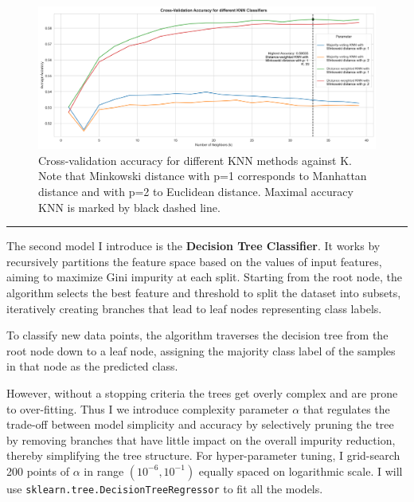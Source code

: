 \documentclass{assignment}
\begin{document}
\bigskip
\bigskip




\begin{figure}[H]
\centering
\includegraphics[width=0.9\linewidth]{KNN_classifier_hyperparameter_tuning_plot.png}
\caption{\label{fig:KNN_classifier_hyperparameter_tuning_plot}Cross-validation accuracy for different KNN methods against K. Note that Minkowski distance with p=1 corresponds to Manhattan distance and with p=2 to Euclidean distance. Maximal accuracy KNN is marked by black dashed line.}
\end{figure}


\newpage

\noindent\rule{16.5cm}{0.55pt}

\bigskip


The second model I introduce is the \textbf{Decision Tree Classifier}. It works by recursively partitions the feature space based on the values of input features, aiming to maximize Gini impurity at each split. Starting from the root node, the algorithm selects the best feature and threshold to split the dataset into subsets, iteratively creating branches that lead to leaf nodes representing class labels. 

\medskip

To classify new data points, the algorithm traverses the decision tree from the root node down to a leaf node, assigning the majority class label of the samples in that node as the predicted class.
\medskip

However, without a stopping criteria the trees get overly complex and are prone to over-fitting. Thus I we introduce complexity parameter $\alpha$ that regulates the trade-off between model simplicity and accuracy by selectively pruning the tree by removing branches that have little impact on the overall impurity reduction, thereby simplifying the tree structure. For hyper-parameter tuning, I grid-search 200 points of $\alpha$ in range $(10^{-6}, 10^{-1})$ equally spaced on logarithmic scale. I will use \texttt{sklearn.tree.DecisionTreeRegressor} to fit all the models.
\end{document}
